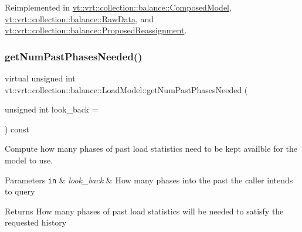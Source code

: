 Reimplemented in \hyperlink{classvt_1_1vrt_1_1collection_1_1balance_1_1_composed_model_abd58ffd308443021356aff2595c6980f}{vt\+::vrt\+::collection\+::balance\+::\+Composed\+Model}, \hyperlink{structvt_1_1vrt_1_1collection_1_1balance_1_1_raw_data_af52829981fa8aec26ac5cfc0a2d29cce}{vt\+::vrt\+::collection\+::balance\+::\+Raw\+Data}, and \hyperlink{structvt_1_1vrt_1_1collection_1_1balance_1_1_proposed_reassignment_a7134943ece9dc9a0d4539536f60eed6e}{vt\+::vrt\+::collection\+::balance\+::\+Proposed\+Reassignment}.

\mbox{\label{structvt_1_1vrt_1_1collection_1_1balance_1_1_load_model_a44905eb3e15e7f22b2f8d1fe7297cea0}} 
\subsubsection{\texorpdfstring{get\+Num\+Past\+Phases\+Needed()}{getNumPastPhasesNeeded()}}
{\footnotesize\ttfamily virtual unsigned int vt\+::vrt\+::collection\+::balance\+::\+Load\+Model\+::get\+Num\+Past\+Phases\+Needed (\begin{DoxyParamCaption}\item[{unsigned int}]{look\+\_\+back = {} }\end{DoxyParamCaption}) const\hspace{0.3cm}{\ttfamily [pure virtual]}}



Compute how many phases of past load statistics need to be kept availble for the model to use. 


\begin{DoxyParams}[1]{Parameters}
\mbox{\tt in}  & {\em look\+\_\+back} & How many phases into the past the caller intends to query\\
\hline
\end{DoxyParams}
\begin{DoxyReturn}{Returns}
How many phases of past load statistics will be needed to satisfy the requested history 
\end{DoxyReturn}


